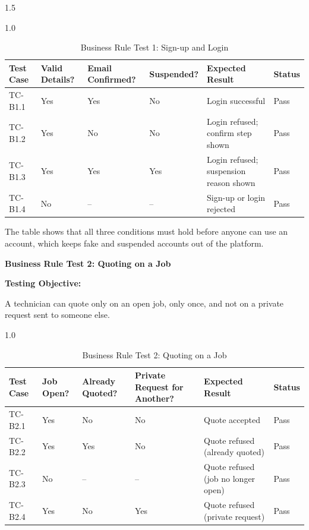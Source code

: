 \documentclass[A4paper,12pt]{report}
\theoremstyle{plain}
\theoremstyle{definition}
\theoremstyle{remark}
\numberwithin{equation}{section}
\begin{document}
\begin{spacing}{1.5}
\begin{table}[H]
\centering
\caption{Business Rule Test 1: Sign-up and Login}
\begin{spacing}{1.0}
{\small
\begin{tabular}{|p{}|p{}|p{}|p{}|p{}|p{}|}
\hline
\textbf{Test Case} & \textbf{Valid Details?} & \textbf{Email Confirmed?} & \textbf{Suspended?} & \textbf{Expected Result} & \textbf{Status} \\ \hline
TC-B1.1 & Yes & Yes & No & Login successful & Pass \\ \hline
TC-B1.2 & Yes & No & No & Login refused; confirm step shown & Pass \\ \hline
TC-B1.3 & Yes & Yes & Yes & Login refused; suspension reason shown & Pass \\ \hline
TC-B1.4 & No & -- & -- & Sign-up or login rejected & Pass \\ \hline
\end{tabular}}
\end{spacing}
\end{table}

The table shows that all three conditions must hold before anyone can use an account, which keeps fake and suspended accounts out of the platform.

\textbf{Business Rule Test 2: Quoting on a Job}

\textbf{Testing Objective:}

A technician can quote only on an open job, only once, and not on a private request sent to someone else.

\begin{table}[H]
\centering
\caption{Business Rule Test 2: Quoting on a Job}
\begin{spacing}{1.0}
{\small
\begin{tabular}{|p{}|p{}|p{}|p{}|p{}|p{}|}
\hline
\textbf{Test Case} & \textbf{Job Open?} & \textbf{Already Quoted?} & \textbf{Private Request for Another?} & \textbf{Expected Result} & \textbf{Status} \\ \hline
TC-B2.1 & Yes & No & No & Quote accepted & Pass \\ \hline
TC-B2.2 & Yes & Yes & No & Quote refused (already quoted) & Pass \\ \hline
TC-B2.3 & No & -- & -- & Quote refused (job no longer open) & Pass \\ \hline
TC-B2.4 & Yes & No & Yes & Quote refused (private request) & Pass \\ \hline
\end{tabular}}
\end{spacing}
\end{table}


\end{spacing}
\end{document}
